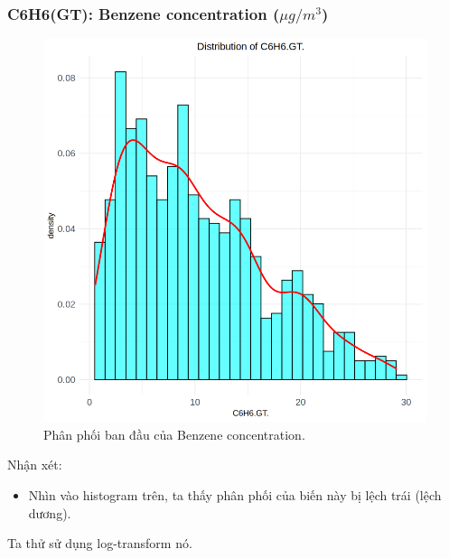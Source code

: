 \subsubsection{C6H6(GT): Benzene concentration ($\mu g/ m^3$)}

\begin{figure}[H]
    \centering
    \includegraphics[width=0.75\columnwidth]{air_figures/C6H6(GT)_original_distribution.png}
    \caption{Phân phối ban đầu của Benzene concentration.}
    \label{fig:benzene_original_distribution}
\end{figure}

Nhận xét:
\begin{itemize}
    \item Nhìn vào histogram trên, ta thấy phân phối của biến này bị lệch trái (lệch dương).
\end{itemize}

Ta thử sử dụng log-transform nó.

